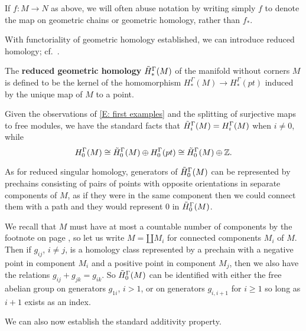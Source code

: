 If $f \colon M \to N$ as above, we will often abuse notation by writing simply $f$ to denote the map on geometric chains or geometric homology, rather than $f_*$.

With functoriality of geometric homology established, we can introduce reduced homology; cf.\ \cite[page 200]{Span81}.

\begin{definition}\label{D: reduced}
The \textbf{reduced geometric homology} $\tilde H_*^\Gamma(M)$ of the manifold without corners $M$ is defined to be the kernel of the homomorphism $H_*^\Gamma(M) \to H_*^\Gamma(pt)$ induced by the unique map of $M$ to a point.
\end{definition}

\begin{remark}\label{R: reduced h}
Given the observations of \cref{E: first examples} and the splitting of surjective maps to free modules, we have the standard facts that $\tilde H_i^\Gamma(M) = H_i^\Gamma(M)$ when $i \neq 0$, while $$H_0^\Gamma(M) \cong \tilde H_0^\Gamma(M) \oplus H_0^\Gamma(pt) \cong \tilde H_0^\Gamma(M) \oplus \mathbb{Z}.$$

As for reduced singular homology, generators of $\tilde H_0^\Gamma(M)$ can be represented by prechains consisting of pairs of points with opposite orientations in separate components of $M$, as if they were in the same component then we could connect them with a path and they would represent $0$ in $\tilde H_0^\Gamma(M)$.

We recall that $M$ must have at most a countable number of components by the footnote on page \pageref{F: countable}, so let us write $M = \amalg M_i$ for connected components $M_i$ of $M$.
Then if $g_{ij}$, $i \neq j$, is a homology class represented by a prechain with a negative point in component $M_i$ and a positive point in component $M_j$, then we also have the relations $g_{ij}+g_{jk}=g_{ik}$.
So $\tilde H_0^\Gamma(M)$ can be identified with either the free abelian group on generators $g_{1i}$, $i>1$, or on generators $g_{i,i+1}$ for $i \geq 1$ so long as $i+1$ exists as an index.
\end{remark}

We can also now establish the standard additivity property.

